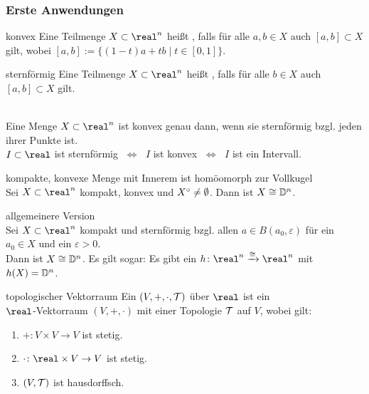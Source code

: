\pagebreak

\subsubsection{%
    Erste Anwendungen%
}

\begin{Def}{konvex}
    Eine Teilmenge $X \subset \real^n$ heißt , falls
    für alle $a, b \in X$ auch $[a, b] \subset X$ gilt, wobei
    $[a, b] := \{(1 - t)a + tb \;|\; t \in [0, 1]\}$.
\end{Def}

\begin{Def}{sternförmig}
    Eine Teilmenge $X \subset \real^n$ heißt
    ,
    falls für alle $b \in X$ auch $[a, b] \subset X$ gilt.
\end{Def}

\begin{Bem}\\
    Eine Menge $X \subset \real^n$ ist konvex genau dann, wenn sie sternförmig
    bzgl. jeden ihrer Punkte ist. \\
    $I \subset \real$ ist sternförmig $\;\Leftrightarrow\;$
    $I$ ist konvex $\;\Leftrightarrow\;$
    $I$ ist ein Intervall.
\end{Bem}

\begin{Satz}{kompakte, konvexe Menge mit Innerem
             ist homöomorph zur Vollkugel}\\
    Sei $X \subset \real^n$ kompakt, konvex und ${X}^\circ \not= \emptyset$.
    Dann ist $X \cong \mathbb{D}^n$.
\end{Satz}

\begin{Satz}{allgemeinere Version}\\
    Sei $X \subset \real^n$ kompakt und sternförmig bzgl. allen
    $a \in B(a_0, \varepsilon)$ für ein $a_0 \in X$ und ein
    $\varepsilon > 0$. \\
    Dann ist $X \cong \mathbb{D}^n$.
    Es gilt sogar:
    Es gibt ein $h\colon \real^n \homoe \real^n$ mit $h(X) = \mathbb{D}^n$.
\end{Satz}

\linie

\begin{Def}{topologischer Vektorraum}
    Ein  $(V, +, \cdot, \mathcal{T})$ über $\real$ ist
    ein \\
    $\real$-Vektorraum $(V, +, \cdot)$ mit einer Topologie $\mathcal{T}$ auf $V$,
    wobei gilt:
    \begin{enumerate}
        \item
        $+\colon V \times V \rightarrow V$ ist stetig.

        \item
        $\cdot\colon \real \times V \rightarrow V$ ist stetig.

        \item
        $(V, \mathcal{T})$ ist hausdorffsch.
    \end{enumerate}
\end{Def}

